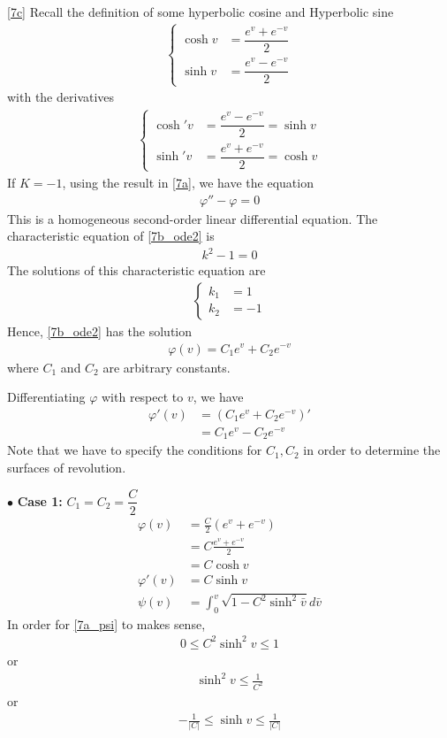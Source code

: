 \documentclass[a4paper]{report}
\begin{document}
\newpage
\ref{7c} Recall the definition of some hyperbolic cosine and Hyperbolic sine
\begin{align}
\begin{cases}
\cosh v &= \dfrac{e^{v} + e^{-v}}{2}\\
\sinh v &= \dfrac{e^{v} - e^{-v}}{2}
\end{cases}
\end{align}
with the derivatives
\begin{align}
\begin{cases}
\cosh' v &= \dfrac{e^{v} - e^{-v}}{2} = \sinh v\\
\sinh' v &= \dfrac{e^{v} + e^{-v}}{2} = \cosh v
\end{cases}
\end{align}
If $K = -1$, using the result in \ref{7a}, we have the equation
\begin{align}
	\varphi'' - \varphi = 0 \label{7b_ode2}
\end{align}
This is a homogeneous second-order linear differential equation. The characteristic equation of \eqref{7b_ode2} is
\begin{align}
k^2 - 1 = 0 
\end{align}
The solutions of this characteristic equation are
\begin{align}
\begin{cases}
k_1 &= 1\\
k_2 &= -1
\end{cases}
\end{align} 
Hence, \eqref{7b_ode2} has the solution
\begin{align}
\varphi(v) = C_1 e^{v} + C_2 e^{-v} \label{7c_phi}
\end{align}
where $C_1$ and $C_2$ are arbitrary constants.

Differentiating $\varphi$ with respect to $v$, we have
\begin{align}
\varphi'(v) &= \left(C_1 e^{v} + C_2 e^{-v}\right)'\\
&= C_1 e^{v} - C_2 e^{-v} \label{7c_phi1}
\end{align}
Note that we have to specify the conditions for $C_1, C_2$ in order to determine the surfaces of revolution.

$\bullet$ \textbf{Case 1:} $C_1 = C_2 = \dfrac{C}{2}$
\begin{align}
\varphi(v) &= \frac{C}{2}( e^{v} + e^{-v})\\
&= C\frac{e^{v} + e^{-v}}{2}\\
&= C \cosh v \label{7c_phi_c1}\\
\varphi'(v) &= C \sinh v\\
\psi(v) &= \int_{0}^{v} \sqrt{1 - C^2 \sinh^2 \bar{v}}d\bar{v}
\end{align}
In order for \eqref{7a_psi} to makes sense,
\begin{align}
0 \leq C^2\sinh^2 v \leq 1
\end{align}
or
\begin{align}
\sinh^2 v \leq \frac{1}{C^2} 
\end{align}
or
\begin{align}
- \frac{1}{\lvert C\rvert}  \leq \sinh v \leq \frac{1}{\lvert C\rvert} 
\end{align}
\end{document}
